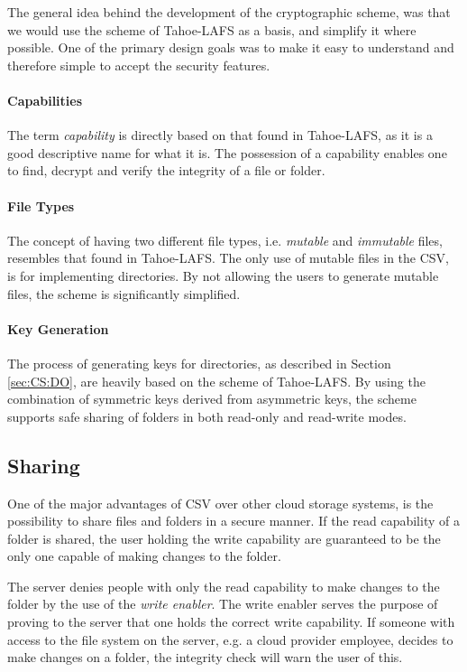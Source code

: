\documentclass[pdftex,english,10pt,b5paper,twoside]{book}
\begin{document}
The general idea behind the development of the cryptographic scheme, was that
we would use the scheme of Tahoe-\ac{LAFS} as a basis, and simplify it where
possible. One of the primary design goals was to make it easy to
understand and therefore simple to accept the security features.

\paragraph{Capabilities} The term \emph{capability} is directly based on that
found in Tahoe-\ac{LAFS}, as it is a good descriptive name for what it is. The
possession of a capability enables one to find, decrypt and verify the
integrity of a file or folder.

\paragraph{File Types} The concept of having two different file types, i.e.
\emph{mutable} and \emph{immutable} files, resembles that found in
Tahoe-\ac{LAFS}. The only use of mutable files in the \acl{CSV}, is for
implementing directories. By not allowing the users to generate mutable files,
the scheme is significantly simplified.

\paragraph{Key Generation} The process of generating keys for directories, as
described in Section \ref{sec:CS:DO}, are heavily based on the scheme of
Tahoe-\ac{LAFS}. By using the combination of symmetric keys derived from
asymmetric keys, the scheme supports safe sharing of folders in both read-only
and read-write modes.

\subsection{Sharing}

One of the major advantages of \ac{CSV} over other cloud storage systems, is
the possibility to share files and folders in a secure manner. If the read
capability of a folder is shared, the user holding the write capability are
guaranteed to be the only one capable of making changes to the folder.

The server denies people with only the read capability to make changes to the
folder by the use of the \emph{write enabler}. The write enabler serves the
purpose of proving to the server that one holds the correct write capability.
If someone with access to the file system on the server, e.g. a cloud
provider employee, decides to make changes on a folder, the integrity check
will warn the user of this.
\end{document}
